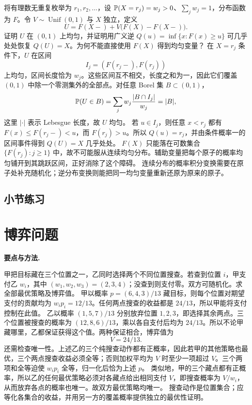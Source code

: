 将有理数无重复枚举为 $r_1,r_2,\ldots$，设 $\mathbb{P}(X=r_j)=w_j>0$、$\sum_jw_j=1$，分布函数为 $F$。令 $V\sim\operatorname{Unif}(0,1)$ 与 $X$ 独立，定义
\[
 U=F(X-)+V\bigl(F(X)-F(X-)\bigr).
\]
证明 $U$ 在 $(0,1)$ 上均匀，并证明用广义逆 $Q(u)=\inf\{x:F(x)\ge u\}$ 可几乎处处恢复 $Q(U)=X$。为何不能直接使用 $F(X)$ 得到均匀变量？
\solution 在 $X=r_j$ 条件下，$U$ 在区间
\[
 I_j=(F(r_j-),F(r_j))
\]
上均匀，区间长度恰为 $w_j$。这些区间互不相交，长度之和为一，因此它们覆盖 $(0,1)$ 中除一个零测集外的全部点。对任意 Borel 集 $B\subset(0,1)$，
\[
 \mathbb{P}(U\in B)=\sum_jw_j\frac{|B\cap I_j|}{w_j}
 =|B|,
\]
这里 $|\cdot|$ 表示 Lebesgue 长度，故 $U$ 均匀。
若 $u\in I_j$，则任意 $x<r_j$ 都有 $F(x)\le F(r_j-)<u$，而 $F(r_j)>u$。所以 $Q(u)=r_j$，并由条件概率一的区间事件得到 $Q(U)=X$ 几乎处处。
$F(X)$ 只能落在可数集合 $\{F(r_j):j\ge1\}$ 中，故不可能服从连续均匀分布。辅助变量把每个原子的概率均匀铺开到其跳跃区间，正好消除了这个障碍。
\insight 连续分布的概率积分变换需要在原子处补充随机化；逆分布变换则能把同一均匀变量重新还原为原来的原子。

\par{}
\subsection*{小节练习}




\section{博弈问题}
\noindent\textbf{要点与方法.}\enspace





甲把目标藏在三个位置之一，乙同时选择两个不同位置搜查。若查到位置 $i$，甲支付乙 $w_i$，其中 $(w_1,w_2,w_3)=(2,3,4)$；没查到则支付零。双方可随机化。求全部最优策略及博弈值。
\solution 甲以概率 $p=(6,4,3)/13$ 藏目标，则每个位置对期望支付的贡献均为 $w_ip_i=12/13$。任何两点搜查的收益都是 $24/13$，所以甲能将支付控制在此值。
乙以概率 $(1,5,7)/13$ 分别放弃位置 $1,2,3$，即选择其余两点。三个位置被搜查的概率为 $(12,8,6)/13$，乘以各自支付后均为 $24/13$。所以不论甲藏哪里，乙都保证获得这个值。两种保证相合，博弈值为
\[
 \boxed{V=24/13}.
\]
还需检查唯一性。上述乙的三个纯搜查动作都有正概率，因此若甲的其他策略也最优，三个两点搜查收益必须全等；否则加权平均为 $V$ 时至少一项超过 $V$。三个两项和全等迫使 $w_ip_i$ 全等，归一化后恰为上述 $p$。
类似地，甲的三个藏点都有正概率，所以乙的任何最优策略必须对各藏点给出相同支付 $V$，即搜查概率为 $V/w_i$，从而放弃各点的概率也唯一。故双方最优策略均唯一。
\insight 搜查动作是位置集合；应等化各集合的收益，并用另一方的覆盖概率提供独立的最优性证明。

